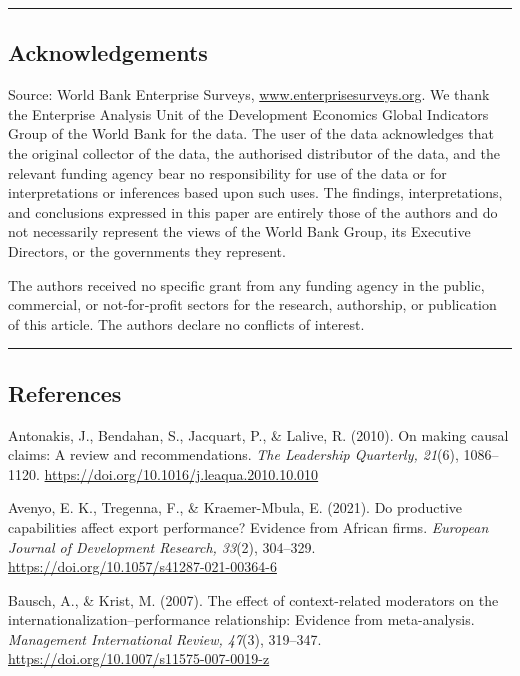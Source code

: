 \documentclass[12pt,a4paper]{article}
\begin{document}
\begin{center}\rule{0.5\linewidth}{0.5pt}\end{center}

\hypertarget{acknowledgements}{%
\subsection{Acknowledgements}\label{acknowledgements}}

Source: World Bank Enterprise Surveys,
\href{http://www.enterprisesurveys.org}{www.enterprisesurveys.org}. We
thank the Enterprise Analysis Unit of the Development Economics Global
Indicators Group of the World Bank for the data. The user of the data
acknowledges that the original collector of the data, the authorised
distributor of the data, and the relevant funding agency bear no
responsibility for use of the data or for interpretations or inferences
based upon such uses. The findings, interpretations, and conclusions
expressed in this paper are entirely those of the authors and do not
necessarily represent the views of the World Bank Group, its Executive
Directors, or the governments they represent.

The authors received no specific grant from any funding agency in the
public, commercial, or not‑for‑profit sectors for the research,
authorship, or publication of this article. The authors declare no
conflicts of interest.

\begin{center}\rule{0.5\linewidth}{0.5pt}\end{center}

\hypertarget{references}{%
\subsection{References}\label{references}}

Antonakis, J., Bendahan, S., Jacquart, P., \& Lalive, R. (2010). On
making causal claims: A review and recommendations. \emph{The Leadership
Quarterly, 21}(6), 1086--1120.
\url{https://doi.org/10.1016/j.leaqua.2010.10.010}

Avenyo, E. K., Tregenna, F., \& Kraemer-Mbula, E. (2021). Do productive
capabilities affect export performance? Evidence from African firms.
\emph{European Journal of Development Research, 33}(2), 304--329.
\url{https://doi.org/10.1057/s41287-021-00364-6}

Bausch, A., \& Krist, M. (2007). The effect of context-related
moderators on the internationalization--performance relationship:
Evidence from meta-analysis. \emph{Management International Review,
47}(3), 319--347. \url{https://doi.org/10.1007/s11575-007-0019-z}
\end{document}
